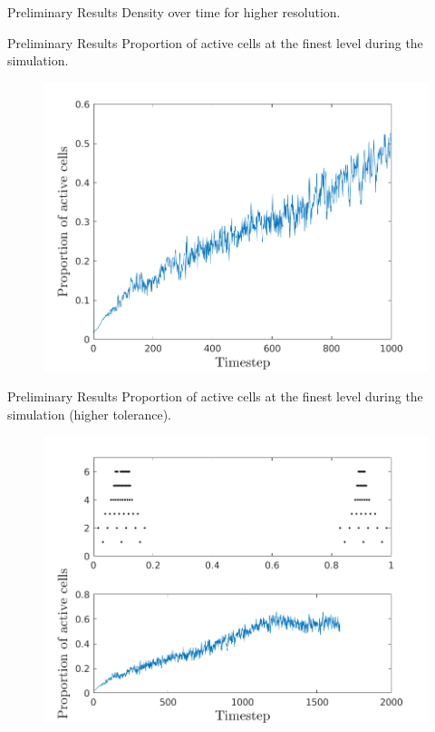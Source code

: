 \documentclass{beamer}
\begin{document}
\begin{frame}{Preliminary Results}
    Density over time for higher resolution.
  \begin{figure}
    \center
  \end{figure}
\end{frame}

\begin{frame}{Preliminary Results}
  Proportion of active cells at the finest level during the simulation.
  \begin{figure}
    \center
    \includegraphics[scale=0.5]{numactive_lores.png}
  \end{figure}
\end{frame}

\begin{frame}{Preliminary Results}
  Proportion of active cells at the finest level during the simulation (higher tolerance).
  \begin{figure}
    \center
    \includegraphics[scale=0.5]{numactive_hires.png}
  \end{figure}
\end{frame}
\end{document}
